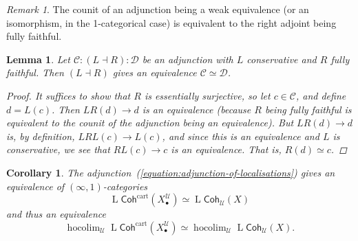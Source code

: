 \documentclass[11pt,fleqn]{article}
\theoremstyle{plain}
\newtheorem{lemma}[theorem]{Lemma}
\newtheorem{corollary}[theorem]{Corollary}
\theoremstyle{definition}
\theoremstyle{remark}
\newtheorem{remark}[theorem]{Remark}
\numberwithin{equation}{theorem}
\newcommand{\cover}{\mathcal{U}}
\newcommand{\gcohUX}{\mathsf{Coh}_{\cover}(X)}
\newcommand{\cartcohX}{\mathsf{Coh}^\mathrm{cart}(X_\bullet^\cover)}
\DeclareMathOperator{\LL}{L}
\DeclareMathOperator{\hocolim}{hocolim}
\begin{document}
        \begin{remark}\label{remark:counit-iso-iff-right-adjoint-fully-faithful}
            The counit of an adjunction being a weak equivalence (or an isomorphism, in the 1-categorical case) is equivalent to the right adjoint being fully faithful.
        \end{remark}

        \begin{lemma}\label{lemma:adjunction-conservative-fully-faithful-is-equiv}
            Let $\mathcal{C}:(L\dashv R):\mathcal{D}$ be an adjunction with $L$ conservative and $R$ fully faithful.
            Then $(L\dashv R)$ gives an equivalence $\mathcal{C}\simeq\mathcal{D}$.
            \begin{proof}
                It suffices to show that $R$ is essentially surjective, so let $c\in\mathcal{C}$, and define $d=L(c)$.
                Then $LR(d)\to d$ is an equivalence (because $R$ being fully faithful is equivalent to the counit of the adjunction being an equivalence).
                But $LR(d)\to d$ is, by definition, $LRL(c)\to L(c)$, and since this is an equivalence and $L$ is conservative, we see that $RL(c)\to c$ is an equivalence. That is, $R(d)\simeq c$.
            \end{proof}
        \end{lemma}

        \begin{corollary}\label{corollary:adjunction-is-equivalence}
            The adjunction~(\ref{equation:adjunction-of-localisations}) gives an equivalence of $(\infty,1)$-categories
            \[
                \LL{\cartcohX} \simeq \LL{\gcohUX}
            \]
            and thus an equivalence
            \[
                \hocolim_\cover\LL{\cartcohX} \simeq \hocolim_\cover\LL{\gcohUX}.
            \]
        \end{corollary}
\end{document}
